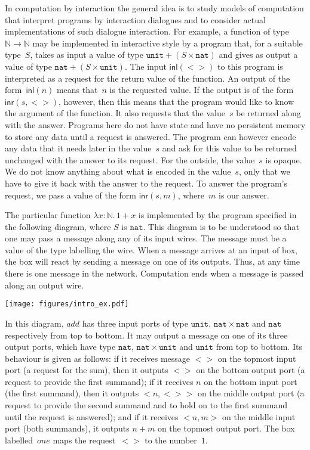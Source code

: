\documentclass{LMCS}
\theoremstyle{definition}
\theoremstyle{plain}
\newcommand{\kw}[1]{\mathsf{#1}}
\newcommand{\NN}{\mathbb{N}}
\newcommand{\unit}{\mathtt{unit}}
\newcommand{\VN}{\mathtt{nat}}
\newcommand{\inl}{\kw{inl}}
\newcommand{\inr}{\kw{inr}}
\newcommand{\tlami}[3]{\lambda {#1}{:}{#2}.\, {#3}}
\begin{document}
In computation by interaction the general idea is to study
models of computation that interpret programs by interaction dialogues 
and to consider actual
implementations of such dialogue interaction. 
For example, a function of type $\NN\to \NN$ may be implemented
in interactive style by a program that, for a suitable type~$S$, takes
as input a value of type $\unit + (S\times \VN)$ and gives as output a value
of type $\VN + (S\times \unit)$. The input $\inl(<>)$ to this program is
interpreted as a request for the return value of the function.  An
output of the form~$\inl(n)$ means that~$n$ is the requested value.  If
the output is of the form~$\inr(s, <>)$, however, then this means that
the program would like to know the argument of the function. 
It also requests that the value~$s$ be returned along with the answer.
Programs here do not have state and 
have no persistent memory to store any data until 
a request is answered.
The program can however encode any data that it needs later in the value~$s$
and ask for this value to be returned unchanged with the answer to its
request. 
For the outside, the value~$s$ is opaque. We do not know anything about 
what is encoded in the value~$s$, only that we have to give it back with the 
answer to the request. 
To answer the program's request, we pass
a value of the form $\inr(s,m)$, where~$m$ is our answer.

The particular function $\tlami x \NN {1 + x}$ 
is implemented by the program specified in the following diagram,
where $S$ is $\VN$.
This diagram is to be understood so that one may pass a message along
any of its input wires. The message must be a value of the type labelling
the wire. When a message arrives at an input of box, the box will react 
by sending a message on one of its outputs. Thus, at any time there is
one message in the network. Computation ends when a message is passed
along an output wire. 
\begin{center}
  \texttt{[image: figures/intro\_ex.pdf]}
\end{center}
In this diagram, 
$\textit{add}$ has three input ports of type $\unit$, $\VN\times \VN$ and $\VN$
respectively from top to bottom.
It may output a message on one of its three output ports, which
have type $\VN$, $\VN \times \unit$ and $\unit$ from top to bottom.
Its behaviour is given as follows:
if it receives message $<>$ on the topmost input port (a request for the sum), 
then it outputs $<>$ on the bottom output port (a request to provide the first
summand); 
if it receives $n$ on the bottom input port (the first summand),
then it outputs $<n,<>>$ on the middle output port (a request to provide the second
summand and to hold on to the first summand until the request is answered); and if
it receives $<n,m>$ on the middle input port (both summands), it outputs $n+m$ 
on the topmost output port.
The box labelled~$\textit{one}$ 
maps the 
request~$<>$ to the number~$1$.
\end{document}
